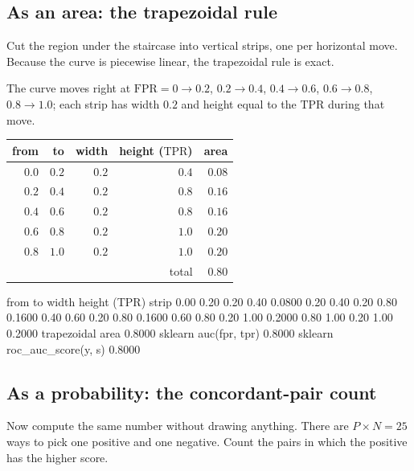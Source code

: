 \documentclass[11pt]{article}
\newcommand{\TPR}{\mathrm{TPR}}
\newcommand{\FPR}{\mathrm{FPR}}
\begin{document}
\subsection{As an area: the trapezoidal rule}

Cut the region under the staircase into vertical strips, one per horizontal
move. Because the curve is piecewise linear, the trapezoidal rule is exact.

\begin{worked}
The curve moves right at $\FPR = 0 \to 0.2$, $0.2 \to 0.4$, $0.4 \to 0.6$,
$0.6 \to 0.8$, $0.8 \to 1.0$; each strip has width $0.2$ and height equal to the
$\TPR$ during that move.
\begin{center}\small
\begin{tabular}{@{}rrrrr@{}}
\toprule
from & to & width & height ($\TPR$) & area\\
\midrule
$0.0$ & $0.2$ & $0.2$ & $0.4$ & $0.08$\\
$0.2$ & $0.4$ & $0.2$ & $0.8$ & $0.16$\\
$0.4$ & $0.6$ & $0.2$ & $0.8$ & $0.16$\\
$0.6$ & $0.8$ & $0.2$ & $1.0$ & $0.20$\\
$0.8$ & $1.0$ & $0.2$ & $1.0$ & $0.20$\\
\midrule
\multicolumn{4}{r}{total} & $\mathbf{0.80}$\\
\bottomrule
\end{tabular}
\end{center}
\end{worked}

\begin{codeout}
  from      to     width  height (TPR)   strip
  0.00    0.20      0.20        0.40       0.0800
  0.20    0.40      0.20        0.80       0.1600
  0.40    0.60      0.20        0.80       0.1600
  0.60    0.80      0.20        1.00       0.2000
  0.80    1.00      0.20        1.00       0.2000
trapezoidal area                                 0.8000
sklearn auc(fpr, tpr)                            0.8000
sklearn roc_auc_score(y, s)                      0.8000
\end{codeout}

\subsection{As a probability: the concordant-pair count}

Now compute the same number without drawing anything. There are $P \times N = 25$
ways to pick one positive and one negative. Count the pairs in which the positive
has the higher score.
\end{document}
